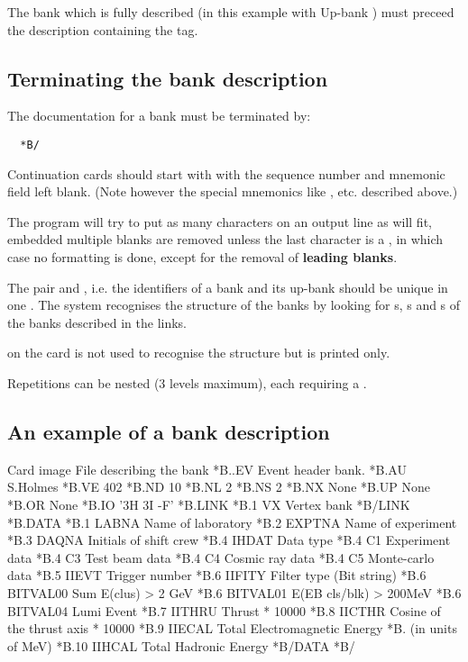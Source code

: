 The bank which is fully described (in this example  with
Up-bank ) must preceed the description containing the 
 tag.
 
 
\subsection{Terminating the bank description}
 
The documentation for a bank must be terminated by:
\begin{verbatim}
  *B/
\end{verbatim}

\begin{Notes}
\item Continuation cards should start with  with the 
      sequence number and mnemonic field
      left blank. (Note however the special mnemonics like 
      ,  etc. described above.)
\item The program will try to put as many characters on an output line 
      as will fit, embedded multiple blanks are removed unless the last 
      character is a , in
      which case no formatting is done, except for the removal of 
      {\bf leading blanks}.
\item The pair  and , i.e. the identifiers of a 
      bank and its up-bank should be unique in one \RZfile. 
      The system recognises the structure of the banks by looking for 
      s, s and s of the banks described 
      in the links. 
\item {} on the card 
      is not used to recognise the structure but is printed only.
\item Repetitions can be nested (3 levels maximum), 
      each  requiring a .
\end{Notes}
 
\subsection{An example of a bank description}
 
\begin{XMPt}{Card image File describing the bank }
*B..EV  Event header bank.
*B.AU    S.Holmes
*B.VE    402
*B.ND    10
*B.NL    2
*B.NS    2
*B.NX    None
*B.UP    None
*B.OR    None
*B.IO    '3H 3I -F'
*B.LINK
*B.1   VX       Vertex bank
*B/LINK
*B.DATA
*B.1   LABNA     Name of laboratory
*B.2   EXPTNA    Name of experiment
*B.3   DAQNA     Initials of shift crew 
*B.4   IHDAT     Data type
*B.4   C1        Experiment data
*B.4   C3        Test beam data
*B.4   C4        Cosmic ray data
*B.4   C5        Monte-carlo data
*B.5   IIEVT     Trigger number
*B.6   IIFITY    Filter type (Bit string)
*B.6   BITVAL00  Sum E(clus) > 2 GeV
*B.6   BITVAL01  E(EB cls/blk) > 200MeV
*B.6   BITVAL04  Lumi Event
*B.7   IITHRU    Thrust * 10000
*B.8   IICTHR    Cosine of the thrust axis * 10000
*B.9   IIECAL    Total Electromagnetic Energy
*B.              (in units of MeV)
*B.10  IIHCAL    Total Hadronic Energy
*B/DATA
*B/
\end{XMPt}
 
